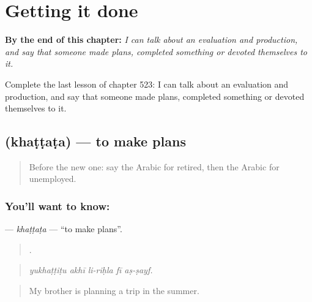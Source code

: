 
\chapter{Getting it done}
\label{ch:ar-getting-it-done}

\begin{chapteropening}
\textbf{By the end of this chapter:} \emph{I can talk about an evaluation and production, and say that someone made plans, completed something or devoted themselves to it.}

Complete the last lesson of chapter 523: I can talk about an evaluation and production, and say that someone made plans, completed something or devoted themselves to it.
\end{chapteropening}

\section[\texorpdfstring{\ar{خطط} (khaṭṭaṭa)}{خطط (khaṭṭaṭa)}]{ (khaṭṭaṭa) — to make plans}

\label{lesson:AR-C523-khattata}



\begin{quote}
Before the new one: say the Arabic for retired, then the Arabic for unemployed.
\end{quote}

\subsection*{You'll want to know: }
\textbf{} — \emph{khaṭṭaṭa} — \textquotedblleft{}to make plans\textquotedblright{}.

\begin{quote}
    .
\end{quote}

\begin{quote}
\emph{yukhaṭṭiṭu akhī li-riḥla fī aṣ-ṣayf.}
\end{quote}

\begin{quote}
My brother is planning a trip in the summer.
\end{quote}

